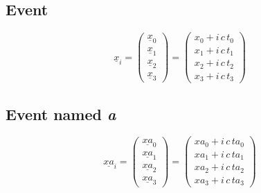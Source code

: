 \documentclass[]{article}
\title{}
\author{}
\begin{document}

\subsection{Event}
\begin{equation}
\underline{x}_i
=
\begin{pmatrix}
	\underline{x}_0\\
	\underline{x}_1\\
	\underline{x}_2\\
	\underline{x}_3
\end{pmatrix}
=
\begin{pmatrix}
	x_0 + i\, c\, t_0\\
	x_1 + i\, c\, t_1\\
	x_2 + i\, c\, t_2\\
	x_3 + i\, c\, t_3
\end{pmatrix}
\end{equation}

\subsection{Event named \textit{a}}
\begin{equation}
\underline{x{\scriptstyle a}}_i
=
\begin{pmatrix}
	\underline{x{\scriptstyle a}}_0\\
	\underline{x{\scriptstyle a}}_1\\
	\underline{x{\scriptstyle a}}_2\\
	\underline{x{\scriptstyle a}}_3
\end{pmatrix}
=
\begin{pmatrix}
	x{\scriptstyle a}_0 + i\, c\, t{\scriptstyle a}_0\\
	x{\scriptstyle a}_1 + i\, c\, t{\scriptstyle a}_1\\
	x{\scriptstyle a}_2 + i\, c\, t{\scriptstyle a}_2\\
	x{\scriptstyle a}_3 + i\, c\, t{\scriptstyle a}_3
\end{pmatrix}
\end{equation}
\end{document}
